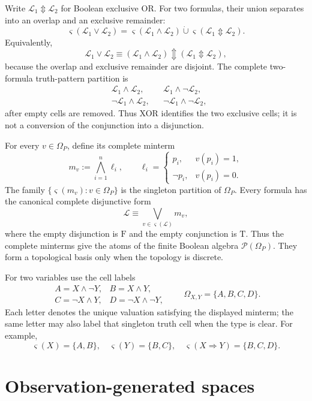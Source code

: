 \documentclass[11pt]{article}
\theoremstyle{definition}
\theoremstyle{plain}
\theoremstyle{remark}
\newcommand{\True}{\mathrm{T}}
\newcommand{\False}{\mathrm{F}}
\newcommand{\Pow}{\mathcal P}
\begin{document}
Write $\mathcal L_1\Updownarrow\mathcal L_2$ for Boolean exclusive OR.  For two
formulas, their union separates into an overlap and an exclusive remainder:
\[
 \varsigma(\mathcal L_1\vee\mathcal L_2)
 =\varsigma(\mathcal L_1\wedge\mathcal L_2)
  \mathbin{\dot\cup}
  \varsigma(\mathcal L_1\Updownarrow\mathcal L_2).
\]
Equivalently,
\[
 \mathcal L_1\vee\mathcal L_2
 \equiv
 (\mathcal L_1\wedge\mathcal L_2)
 \Updownarrow
 (\mathcal L_1\Updownarrow\mathcal L_2),
\]
because the overlap and exclusive remainder are disjoint.  The complete
two-formula truth-pattern partition is
\begin{align*}
 &\mathcal L_1\wedge\mathcal L_2,
 &&\mathcal L_1\wedge\neg\mathcal L_2,\\
 &\neg\mathcal L_1\wedge\mathcal L_2,
 &&\neg\mathcal L_1\wedge\neg\mathcal L_2,
\end{align*}
after empty cells are removed.  Thus XOR identifies the two exclusive cells;
it is not a conversion of the conjunction into a disjunction.

For every $v\in\Omega_P$, define its complete minterm
\[
  m_v:=\bigwedge_{i=1}^n \ell_i,
  \qquad
  \ell_i=
  \begin{cases}
    p_i,&v(p_i)=1,\\
    \neg p_i,&v(p_i)=0.
  \end{cases}
\]
The family $\{\varsigma(m_v):v\in\Omega_P\}$ is the singleton partition of
$\Omega_P$.  Every formula has the canonical complete disjunctive form
\[
  \mathcal L\equiv
  \bigvee_{v\in\varsigma(\mathcal L)}m_v,
\]
where the empty disjunction is $\False$ and the empty conjunction is $\True$.
Thus the complete minterms give the atoms of the finite Boolean algebra
$\Pow(\Omega_P)$.  They form a topological basis only when the topology is
discrete.

For two variables use the cell labels
\[
\begin{array}{ll}
 A=X\wedge\neg Y, & B=X\wedge Y,\\
 C=\neg X\wedge Y, & D=\neg X\wedge\neg Y,
\end{array}
\qquad
\Omega_{X,Y}=\{A,B,C,D\}.
\]
Each letter denotes the unique valuation satisfying the displayed minterm; the
same letter may also label that singleton truth cell when the type is clear.
For example,
\[
 \varsigma(X)=\{A,B\},\quad
 \varsigma(Y)=\{B,C\},\quad
 \varsigma(X\Rightarrow Y)=\{B,C,D\}.
\]

\section{Observation-generated spaces}
\end{document}
